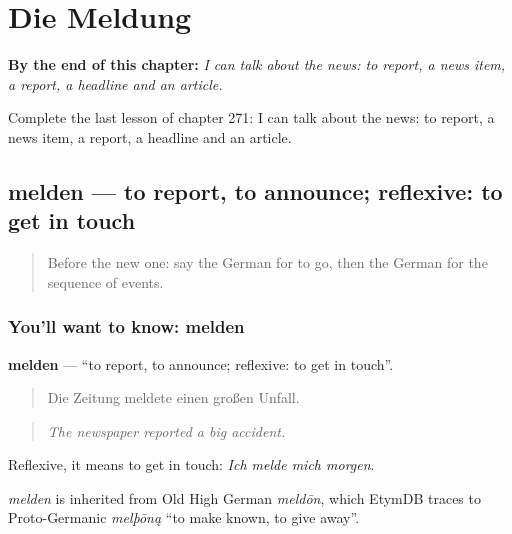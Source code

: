 
\chapter{Die Meldung}
\label{ch:ge-die-meldung}

\begin{chapteropening}
\textbf{By the end of this chapter:} \emph{I can talk about the news: to report, a news item, a report, a headline and an article.}

Complete the last lesson of chapter 271: I can talk about the news: to report, a news item, a report, a headline and an article.
\end{chapteropening}

\section[melden]{melden — to report, to announce; reflexive: to get in touch}

\label{lesson:GE-C271-melden}



\begin{quote}
Before the new one: say the German for to go, then the German for the sequence of events.
\end{quote}

\subsection*{You'll want to know: melden}
\textbf{melden} — \textquotedblleft{}to report, to announce; reflexive: to get in touch\textquotedblright{}.

\begin{quote}
Die Zeitung meldete einen großen Unfall.
\end{quote}

\begin{quote}
\emph{The newspaper reported a big accident.}
\end{quote}

Reflexive, it means to get in touch: \emph{Ich melde mich morgen}.

\begin{cousinweb}
\emph{melden} is inherited from Old High German \emph{meldōn}, which EtymDB traces to Proto-Germanic \emph{melþōną} \textquotedblleft{}to make known, to give away\textquotedblright{}.
\end{cousinweb}

